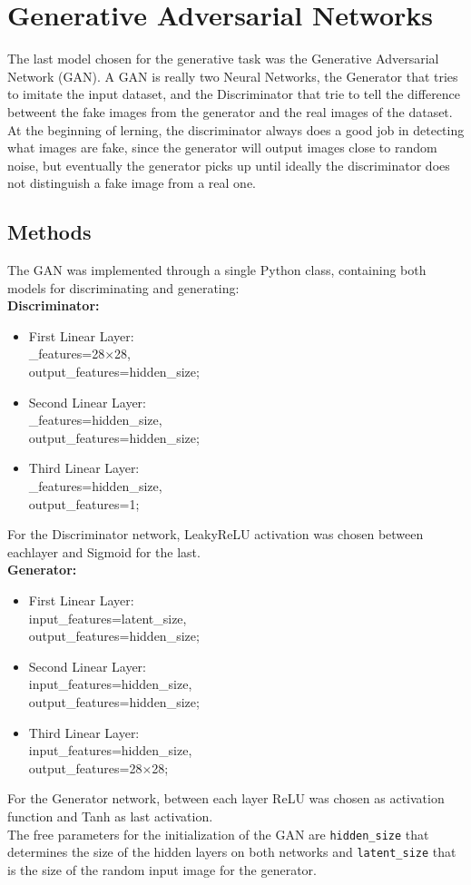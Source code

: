 \documentclass[11pt,a4paper,twocolumn]{IEEEtran}
\begin{document}
	\section{\textbf{Generative Adversarial Networks}}
		The last model chosen for the generative task was the Generative Adversarial Network (GAN). A GAN is really two Neural Networks, the Generator that tries to imitate the input dataset, and the Discriminator that trie to tell the difference betweent the fake images from the generator and the real images of the dataset.\\
		At the beginning of lerning, the discriminator always does a good job in detecting what images are fake, since the generator will output images close to random noise, but eventually the generator picks up until ideally the discriminator does not distinguish a fake image from a real one.
		\subsection{\textbf{Methods}}
		The GAN was implemented through a single Python class, containing both models for discriminating and generating:\\
		\textbf{Discriminator:}
		\begin{itemize}
			\item First Linear Layer: \\_features=28$\times$28,\\ output\_features=hidden\_size;
			\item Second Linear Layer: \\_features=hidden\_size,\\ output\_features=hidden\_size;
			\item Third Linear Layer: \\_features=hidden\_size,\\ output\_features=1;
		\end{itemize}
		For the Discriminator network, LeakyReLU activation was chosen between eachlayer and Sigmoid for the last.\\
		\textbf{Generator:}
		\begin{itemize}
			\item First Linear Layer:\\ input\_features=latent\_size,\\ output\_features=hidden\_size;
			\item Second Linear Layer:\\ input\_features=hidden\_size,\\ output\_features=hidden\_size;
			\item Third Linear Layer:\\ input\_features=hidden\_size,\\ output\_features=28$\times$28;
		\end{itemize}
		For the Generator network, between each layer ReLU was chosen as activation function and Tanh as last activation.\medskip\\
		The free parameters for the initialization of the GAN are \texttt{hidden\_size} that determines the size of the hidden layers on both networks and \texttt{latent\_size} that is the size of the random input image for the generator.
\end{document}
